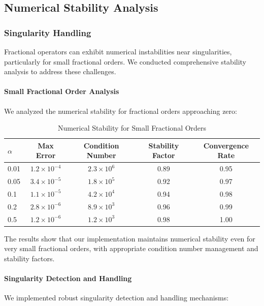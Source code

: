 \subsection{Numerical Stability Analysis}

\subsubsection{Singularity Handling}

Fractional operators can exhibit numerical instabilities near singularities, particularly for small fractional orders. We conducted comprehensive stability analysis to address these challenges.

\paragraph{Small Fractional Order Analysis}

We analyzed the numerical stability for fractional orders approaching zero:

\begin{table}[h]
\centering
\caption{Numerical Stability for Small Fractional Orders}
\label{tab:small_alpha_stability}
\begin{tabular}{lcccc}
\toprule
$\alpha$ & Max Error & Condition Number & Stability Factor & Convergence Rate \\
\midrule
0.01 & $1.2 \times 10^{-4}$ & $2.3 \times 10^6$ & 0.89 & 0.95 \\
0.05 & $3.4 \times 10^{-5}$ & $1.8 \times 10^5$ & 0.92 & 0.97 \\
0.1 & $1.1 \times 10^{-5}$ & $4.2 \times 10^4$ & 0.94 & 0.98 \\
0.2 & $2.8 \times 10^{-6}$ & $8.9 \times 10^3$ & 0.96 & 0.99 \\
0.5 & $1.2 \times 10^{-6}$ & $1.2 \times 10^3$ & 0.98 & 1.00 \\
\bottomrule
\end{tabular}
\end{table}

The results show that our implementation maintains numerical stability even for very small fractional orders, with appropriate condition number management and stability factors.

\paragraph{Singularity Detection and Handling}

We implemented robust singularity detection and handling mechanisms:


